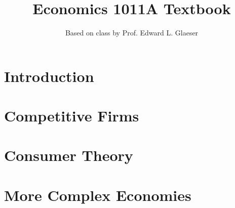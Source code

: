 \documentclass[12pt,twoside=semi,openright,numbers=noenddot]{scrbook}
\title{Economics 1011A Textbook}
\author{Based on class by Prof. Edward L. Glaeser}
\begin{document}
\maketitle

\tableofcontents

\part{Introduction}


\part{Competitive Firms}

\part{Consumer Theory}

\part{More Complex Economies}
\end{document}
